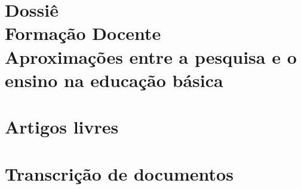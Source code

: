 

\mainmatter

\part[Dossiê: Formação docente: \itshape{aproximações entre a pesquisa e o ensino na educação básica}]{{\normalsize Dossiê}\\
Formação Docente\\
\textup{Aproximações entre a pesquisa e o ensino na educação básica}
}
















\part{Artigos livres}



\part{Transcrição de documentos}




\backmatter





